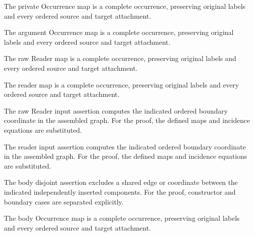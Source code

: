 The private Occurrence map is a complete occurrence, preserving original labels and every ordered source and target attachment.
\par{}

The argument Occurrence map is a complete occurrence, preserving original labels and every ordered source and target attachment.
\par{}

The raw Reader map is a complete occurrence, preserving original labels and every ordered source and target attachment.
\par{}

The reader map is a complete occurrence, preserving original labels and every ordered source and target attachment.
\par{}

The raw Reader input assertion computes the indicated ordered boundary coordinate in the assembled graph.
For the proof, the defined maps and incidence equations are substituted.
\par{}

The reader input assertion computes the indicated ordered boundary coordinate in the assembled graph.
For the proof, the defined maps and incidence equations are substituted.
\par{}

The body disjoint assertion excludes a shared edge or coordinate between the indicated independently inserted components.
For the proof, constructor and boundary cases are separated explicitly.
\par{}

The body Occurrence map is a complete occurrence, preserving original labels and every ordered source and target attachment.
\par{}

